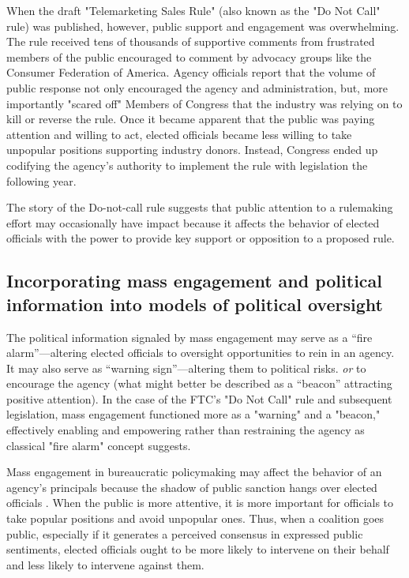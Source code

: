 When the draft "Telemarketing Sales Rule" (also known as the "Do Not Call" rule) was published, however, public support and engagement was overwhelming. The rule received tens of thousands of supportive comments from frustrated members of the public encouraged to comment by advocacy groups like the Consumer Federation of America. Agency officials report that the volume of public response not only encouraged the agency and administration, but, more importantly "scared off" Members of Congress that the industry was relying on to kill or reverse the rule. Once it became apparent that the public was paying attention and willing to act, elected officials became less willing to take unpopular positions supporting industry donors. Instead, Congress ended up codifying the agency's authority to implement the rule with legislation the following year.

The story of the Do-not-call rule suggests that public attention to a rulemaking effort may occasionally have impact because it affects the behavior of elected officials with the power to provide key support or opposition to a proposed rule.




\subsection{Incorporating mass engagement and political information into models of political oversight}

The political information signaled by mass engagement may serve as a ``fire alarm''---altering elected officials to oversight opportunities to rein in an agency. It may also serve as ``warning sign''---altering them to political risks.
\emph{or} to encourage the agency (what might better be described as a ``beacon'' attracting positive attention). In the case of the FTC's "Do Not Call" rule and subsequent legislation, mass engagement functioned more as a "warning" and a "beacon," effectively enabling and empowering rather than restraining the agency as classical "fire alarm" concept suggests.

Mass engagement in bureaucratic policymaking may affect the behavior of an agency's principals because the shadow of public sanction hangs over elected officials \citep{Arnold1979, Mayhew2000}. When the public is more attentive, it is more important for officials to take popular positions and avoid unpopular ones.
Thus, when a coalition goes public, especially if it generates a perceived consensus in expressed public sentiments, elected officials ought to be more likely to intervene on their behalf and less likely to intervene against them.  

